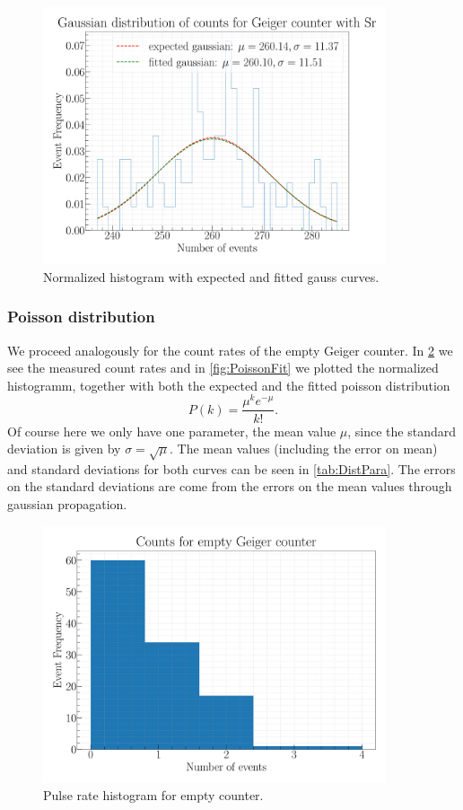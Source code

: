 \begin{figure}[H]
\centering
\includegraphics[width=0.9\textwidth]{../Figures/Geiger_gauss_fit.pdf}
\caption{Normalized histogram with expected and fitted gauss curves.}
\label{fig:GaussFit}
\end{figure}

\subsubsection{Poisson distribution}

We proceed analogously for the count rates of the empty Geiger counter. In \cref{fig:PoissonHist} we see the measured count rates and in \cref{fig:PoissonFit} we plotted the normalized histogramm, together with both the expected and the fitted poisson distribution
\begin{equation}
P(k) = \frac{\mu^k e^{-\mu}}{k!}.
\end{equation}
Of course here we only have one parameter, the mean value $\mu$, since the standard deviation is given by $\sigma = \sqrt{\mu}$. The mean values (including the error on mean) and standard deviations for both curves can be seen in \cref{tab:DistPara}. The errors on the standard deviations are come from the errors on the mean values through gaussian propagation.

\begin{figure}[H]
\centering
\includegraphics[width=0.9\textwidth]{../Figures/Geiger_poisson_histogram.pdf}
\caption{Pulse rate histogram for empty counter.}
\label{fig:PoissonHist}
\end{figure}


